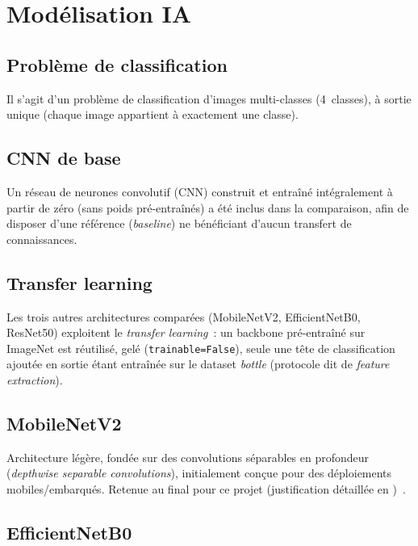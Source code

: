 \chapter{Mod\'elisation IA}
\label{ch:modelisation}

\section{Probl\`eme de classification}

Il s'agit d'un probl\`eme de classification d'images multi-classes (4~classes), \`a sortie unique (chaque image appartient \`a exactement une classe).

\section{CNN de base}

Un r\'eseau de neurones convolutif (CNN) construit et entra\^in\'e int\'egralement \`a partir de z\'ero (sans poids pr\'e-entra\^in\'es) a \'et\'e inclus dans la comparaison, afin de disposer d'une r\'ef\'erence (\emph{baseline}) ne b\'en\'eficiant d'aucun transfert de connaissances.

\section{Transfer learning}

Les trois autres architectures compar\'ees (MobileNetV2, EfficientNetB0, ResNet50) exploitent le \emph{transfer learning}~: un backbone pr\'e-entra\^in\'e sur ImageNet est r\'eutilis\'e, gel\'e (\texttt{trainable=False}), seule une t\^ete de classification ajout\'ee en sortie \'etant entra\^in\'ee sur le dataset \emph{bottle} (protocole dit de \emph{feature extraction}).

\section{MobileNetV2}

Architecture l\'eg\`ere, fond\'ee sur des convolutions s\'eparables en profondeur (\emph{depthwise separable convolutions}), initialement con\c{c}ue pour des d\'eploiements mobiles/embarqu\'es. Retenue au final pour ce projet (justification d\'etaill\'ee en )~\cite{mobilenetv2}.

\section{EfficientNetB0}

